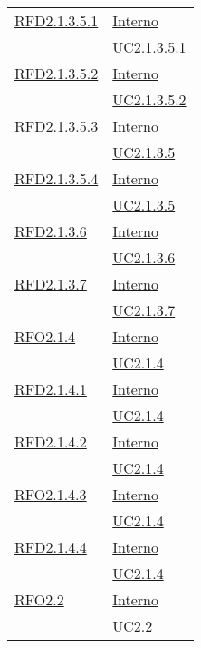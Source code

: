 \begin{longtable}{|>{\centering}m{5cm}|m{5cm}<{\centering}|}
\hyperlink{RFD2.1.3.5.1}{RFD2.1.3.5.1} & \hyperlink{Interno}{Interno}\\
& \hyperref[UC2.1.3.5.1]{UC2.1.3.5.1}\\ \hline

\hyperlink{RFD2.1.3.5.2}{RFD2.1.3.5.2} & \hyperlink{Interno}{Interno}\\
& \hyperref[UC2.1.3.5.2]{UC2.1.3.5.2}\\ \hline

\hyperlink{RFD2.1.3.5.3}{RFD2.1.3.5.3} & \hyperlink{Interno}{Interno}\\
& \hyperref[UC2.1.3.5]{UC2.1.3.5}\\ \hline

\hyperlink{RFD2.1.3.5.4}{RFD2.1.3.5.4} & \hyperlink{Interno}{Interno}\\
& \hyperref[UC2.1.3.5]{UC2.1.3.5}\\ \hline

\hyperlink{RFD2.1.3.6}{RFD2.1.3.6} & \hyperlink{Interno}{Interno}\\
& \hyperref[UC2.1.3.6]{UC2.1.3.6}\\ \hline

\hyperlink{RFD2.1.3.7}{RFD2.1.3.7} & \hyperlink{Interno}{Interno}\\
& \hyperref[UC2.1.3.7]{UC2.1.3.7}\\ \hline

\hyperlink{RFO2.1.4}{RFO2.1.4} & \hyperlink{Interno}{Interno}\\
& \hyperref[UC2.1.4]{UC2.1.4}\\ \hline

\hyperlink{RFD2.1.4.1}{RFD2.1.4.1} & \hyperlink{Interno}{Interno}\\
& \hyperref[UC2.1.4]{UC2.1.4}\\ \hline

\hyperlink{RFD2.1.4.2}{RFD2.1.4.2} & \hyperlink{Interno}{Interno}\\
& \hyperref[UC2.1.4]{UC2.1.4}\\ \hline

\hyperlink{RFO2.1.4.3}{RFO2.1.4.3} & \hyperlink{Interno}{Interno}\\
& \hyperref[UC2.1.4]{UC2.1.4}\\ \hline

\hyperlink{RFD2.1.4.4}{RFD2.1.4.4} & \hyperlink{Interno}{Interno}\\
& \hyperref[UC2.1.4]{UC2.1.4}\\ \hline

\hyperlink{RFO2.2}{RFO2.2} & \hyperlink{Interno}{Interno}\\
& \hyperref[UC2.2]{UC2.2}\\ \hline


\end{longtable}
